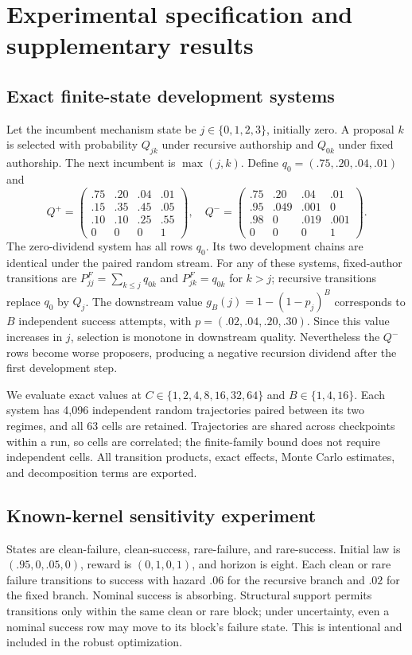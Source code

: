 \section{Experimental specification and supplementary results}\label{app:results}
\subsection{Exact finite-state development systems}
Let the incumbent mechanism state be $j\in\{0,1,2,3\}$, initially zero. A proposal $k$ is selected with probability $Q_{jk}$ under recursive authorship and $Q_{0k}$ under fixed authorship. The next incumbent is $\max(j,k)$. Define $q_0=(.75,.20,.04,.01)$ and
\[
 Q^+=\begin{pmatrix}
 .75&.20&.04&.01\\ .15&.35&.45&.05\\ .10&.10&.25&.55\\0&0&0&1
 \end{pmatrix},\quad
 Q^-=\begin{pmatrix}
 .75&.20&.04&.01\\ .95&.049&.001&0\\ .98&0&.019&.001\\0&0&0&1
 \end{pmatrix}.
\]
The zero-dividend system has all rows $q_0$. Its two development chains are identical under the paired random stream. For any of these systems, fixed-author transitions are $P^F_{jj}=\sum_{k\leq j}q_{0k}$ and $P^F_{jk}=q_{0k}$ for $k>j$; recursive transitions replace $q_0$ by $Q_j$. The downstream value $g_B(j)=1-(1-p_j)^B$ corresponds to $B$ independent success attempts, with $p=(.02,.04,.20,.30)$. Since this value increases in $j$, selection is monotone in downstream quality. Nevertheless the $Q^-$ rows become worse proposers, producing a negative recursion dividend after the first development step.

We evaluate exact values at $C\in\{1,2,4,8,16,32,64\}$ and $B\in\{1,4,16\}$. Each system has 4,096 independent random trajectories paired between its two regimes, and all 63 cells are retained. Trajectories are shared across checkpoints within a run, so cells are correlated; the finite-family bound does not require independent cells. All transition products, exact effects, Monte Carlo estimates, and decomposition terms are exported.

\subsection{Known-kernel sensitivity experiment}
States are clean-failure, clean-success, rare-failure, and rare-success. Initial law is $(.95,0,.05,0)$, reward is $(0,1,0,1)$, and horizon is eight. Each clean or rare failure transitions to success with hazard $.06$ for the recursive branch and $.02$ for the fixed branch. Nominal success is absorbing. Structural support permits transitions only within the same clean or rare block; under uncertainty, even a nominal success row may move to its block's failure state. This is intentional and included in the robust optimization.

